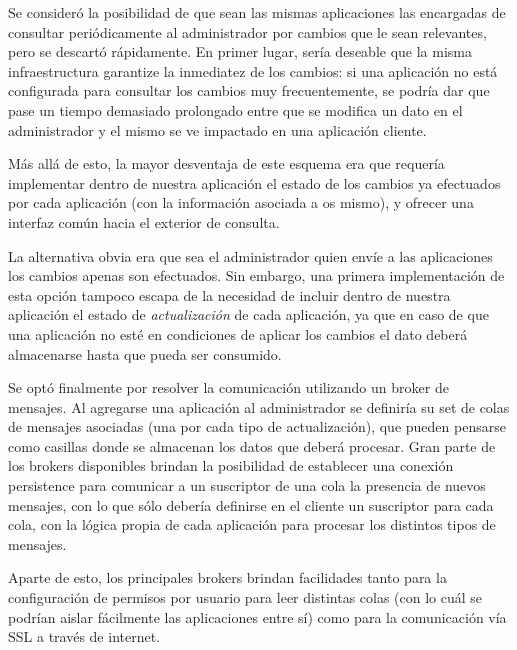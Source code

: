 Se consideró la posibilidad de que sean las mismas aplicaciones las encargadas de consultar periódicamente al
administrador por cambios que le sean relevantes, pero se descartó rápidamente. En primer lugar, sería deseable
que la misma infraestructura garantize la inmediatez de los cambios: si una aplicación no está configurada para
consultar los cambios muy frecuentemente, se podría dar que pase un tiempo demasiado prolongado entre que se
modifica un dato en el administrador y el mismo se ve impactado en una aplicación cliente.

Más allá de esto, la mayor desventaja de este esquema era que requería implementar dentro de nuestra aplicación
el estado de los cambios ya efectuados por cada aplicación (con la información asociada a os mismo), y ofrecer
una interfaz común hacia el exterior de consulta.

La alternativa obvia era que sea el administrador quien envíe a las aplicaciones los cambios apenas son efectuados.
Sin embargo, una primera implementación de esta opción tampoco escapa de la necesidad de incluir dentro de nuestra
aplicación el estado de \textit{actualización} de cada aplicación, ya que en caso de que una aplicación no esté
en condiciones de aplicar los cambios el dato deberá almacenarse hasta que pueda ser consumido.

%
%

Se optó finalmente por resolver la comunicación utilizando un broker de mensajes. Al agregarse una aplicación
al administrador se definiría su set de colas de mensajes asociadas (una por cada tipo de actualización), que
pueden pensarse como casillas donde  se almacenan los datos que deberá procesar. Gran parte de los brokers
disponibles brindan la posibilidad de establecer una conexión persistence para comunicar a un suscriptor de una
cola la presencia de nuevos mensajes, con lo que sólo debería definirse en el cliente un suscriptor para cada
cola, con la lógica propia de cada aplicación para procesar los distintos tipos de mensajes.

Aparte de esto, los principales brokers brindan facilidades tanto para la configuración de permisos por usuario
para leer distintas colas (con lo cuál se podrían aislar fácilmente las aplicaciones entre sí) como para la
comunicación vía SSL a través de internet.

\vspace{15 mm}

